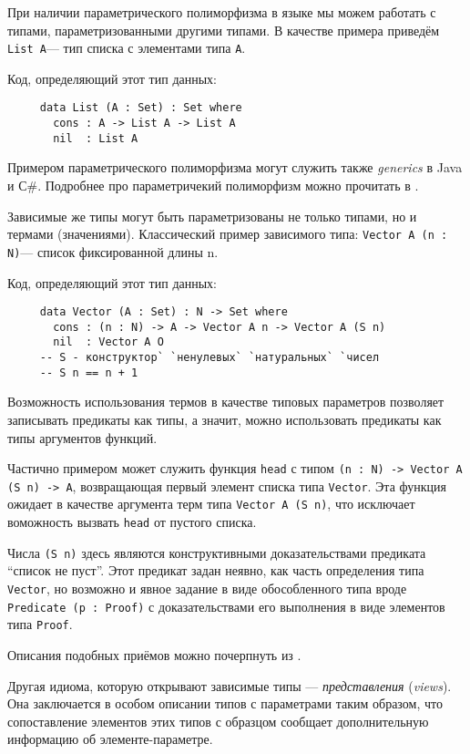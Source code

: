 \documentclass[aps,12pt,final,oneside,onecolumn,musixtex,superscriptaddress,centertags]{article}
\newcommand{\lcode}[1]{\lstinline[basicstyle=\ttfamily\normalsize]{#1}}
\begin{document}
     При наличии параметрического полиморфизма в языке мы можем работать с типами, параметризованными другими типами. В качестве примера приведём \lcode{List A}\:--- тип списка с элементами типа \lcode{A}.

     Код, определяющий этот тип данных:
     \begin{lstlisting}
     data List (A : Set) : Set where
       cons : A -> List A -> List A
       nil  : List A
     \end{lstlisting}

     Примером параметрического полиморфизма могут служить также \emph{generics} в Java и С\#. Подробнее про параметричекий полиморфизм можно прочитать в \cite{DBLP:journals/lisp/Strachey00}.

     Зависимые же типы могут быть параметризованы не только типами, но и термами (значениями). Классический пример зависимого типа: \lcode{Vector A (n : N)}\:--- список фиксированной длины n.

     Код, определяющий этот тип данных:
     \begin{lstlisting}
     data Vector (A : Set) : N -> Set where
       cons : (n : N) -> A -> Vector A n -> Vector A (S n)
       nil  : Vector A O
     -- S - конструктор` `ненулевых` `натуральных` `чисел
     -- S n == n + 1
     \end{lstlisting}
     
     Возможность использования термов в качестве типовых параметров позволяет записывать предикаты как типы, а значит, можно использовать предикаты как типы аргументов функций.

     Частично примером может служить функция \lcode{head} с типом \lcode{(n : N) -> Vector A (S n) -> A}, возвращающая первый элемент списка типа \lcode{Vector}. Эта функция ожидает в качестве аргумента терм типа \lcode{Vector A (S n)}, что исключает воможность вызвать \lcode{head} от пустого списка.

     Числа \lcode{(S n)} здесь являются конструктивными доказательствами предиката ``список не пуст''. Этот предикат задан неявно, как часть определения типа \lcode{Vector}, но возможно и явное задание в виде обособленного типа вроде \lcode{Predicate (p : Proof)} с доказательствами его выполнения в виде элементов типа \lcode{Proof}.

     Описания подобных приёмов можно почерпнуть из \cite{DBLP:conf/tldi/Norell09}.

     Другая идиома, которую открывают зависимые типы --- \emph{представления} (\emph{views}). Она заключается в особом описании типов с параметрами таким образом, что сопоставление элементов этих типов с образцом сообщает дополнительную информацию об элементе-параметре.
\end{document}
